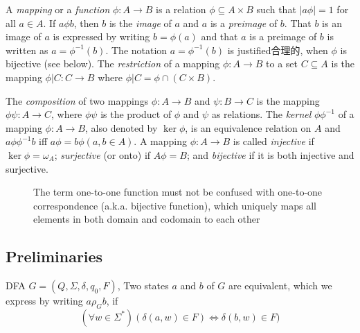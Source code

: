 A \textit{mapping} or a \textit{function} $\phi:A\to B$ is a relation $\phi\subseteq A\times B$ such that $|a\phi|=1$ for all $a\in A$. If $a\phi b$, then $b$ is the \textit{image} of $a$ and $a$ is a \textit{preimage} of $b$. That $b$ is an image of $a$ is expressed by writing $b=\phi(a)$ and that $a$ is a preimage of $b$ is written as $a=\phi^{-1}(b)$. The notation $a=\phi^{-1}(b)$ is justified合理的, when  $\phi$  is bijective (see below). The \textit{restriction} of a mapping $\phi:A\to B$ to a set $C\subseteq  A$ is the mapping $\phi|C:C\to B$ where $\phi|C=\phi\cap(C\times B)$.

The \textit{composition} of two mappings $\phi:A\to B$ and $\psi:B\to C$ is the mapping
$\phi\psi: A\to C$, where $\phi\psi$ is the product of $\phi$ and $\psi$ as relations. The \textit{kernel} $\phi\phi^{-1}$ of a mapping $\phi:A\to B$, also denoted by $\ker\phi$, is an equivalence relation on $A$ and $a\phi\phi^{-1}b$ iff $a\phi=b\phi (a,b\in A)$. A mapping $\phi:A\to B$ is called \textit{injective} if $\ker \phi=\omega_A$; \textit{surjective} (or onto) if $A\phi =B$; and \textit{bijective} if it is both injective and surjective.

\begin{figure}[htbp]
\caption{The term one-to-one function must not be confused with one-to-one correspondence (a.k.a. bijective function), which uniquely maps all elements in both domain and codomain to each other}
\end{figure}

\subsection{Preliminaries}

\begin{definition}[$a\rho_Gb$]
	DFA $G=(Q,\Sigma,\delta,q_0,F)$, Two states $a$ and $b$ of $G$ are equivalent, which we express by writing $a\rho_G b$, if 
	\[(\forall w\in \Sigma^\ast) (\delta(a,w)\in F)\Leftrightarrow\delta(b,w)\in F) \]
\end{definition}

